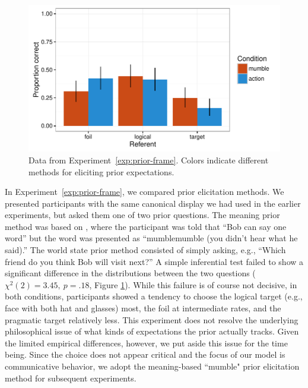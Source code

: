 \documentclass[man]{apa6}
\newcounter{Experiment}
\newcommand{\exptref}[1]{Experiment~\ref{#1}}
\begin{document}
\begin{figure}[t]
  \centering
  \includegraphics[width=5in]{../plots/2-prior-frame.pdf}
  \caption{\label{fig:prior-frame} Data from \exptref{exp:prior-frame}. Colors indicate different methods for eliciting prior expectations.}
\end{figure}

In \exptref{exp:prior-frame}, we compared prior elicitation methods. We presented participants with the same canonical display we had used in the earlier experiments, but asked them one of two prior questions. The meaning prior method was based on , where the participant was told that ``Bob can say one word'' but the word was presented as ``mumblemumble (you didn't hear what he said).'' The world state prior method consisted of simply asking, e.g., ``Which friend do you think Bob will visit next?'' A simple inferential test failed to show a significant difference in the distributions between the two questions ($\chi^2(2) = 3.45,~p = .18$, Figure \ref{fig:prior-frame}). While this failure is of course not decisive, in both conditions, participants showed a tendency to choose the logical target (e.g., face with both hat and glasses) most, the foil at intermediate rates, and the pragmatic target relatively less. This experiment does not resolve the underlying philosophical issue of what kinds of expectations the prior actually tracks. Given the limited empirical differences, however, we put aside this issue for the time being. Since the choice does not appear critical and the focus of our model is communicative behavior, we  adopt the meaning-based ``mumble" prior elicitation method for subsequent experiments.
\end{document}
